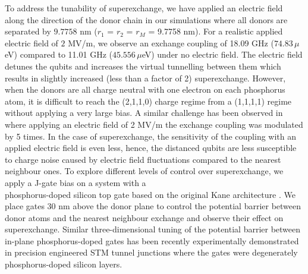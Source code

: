 \documentclass[%
showkeys,
 amsmath,amssymb,
 aps,
prb,
]{revtex4-2}
\begin{document}
To address the tunability of superexchange, we have applied an electric field along the direction of the donor chain in our simulations where all donors are separated by $9.7758$ nm ($r_1$ = $r_2$ = $r_M$ = 9.7758 nm). For a realistic applied electric field of $2$ MV/m, we observe an exchange coupling of 18.09 GHz ($74.83\,\mu$eV) compared to 11.01 GHz ($45.556\,\mu$eV) under no electric field. The electric field detunes the qubits and increases the virtual tunnelling between them which results in slightly increased (less than a factor of 2) superexchange. However, when the donors are all charge neutral with one electron on each phosphorus atom, it is difficult to reach the (2,1,1,0) charge regime from a (1,1,1,1) regime without applying a very large bias. A similar challenge has been observed in \cite{wangHighlyTunableExchange2016a} where applying an electric field of 2 MV/m the exchange coupling was modulated by 5 times. In the case of superexchange, the sensitivity of the coupling with an applied electric field is even less, hence, the distanced qubits are less susceptible to charge noise caused by electric field fluctuations compared to the nearest neighbour ones. 
To explore different levels of control over superexchange, we apply a J-gate bias on a system with a \\ phosphorus-doped silicon top gate based on the original Kane architecture \cite{kaneSiliconbasedNuclearSpin1998}. We place gates 30 nm above the donor plane to control the potential barrier between donor atoms and the nearest neighbour exchange and observe their effect on superexchange. Similar three-dimensional tuning of the potential barrier between in-plane phosphorus-doped gates has been recently experimentally demonstrated \cite{donnelly2021monolithic} in precision engineered STM tunnel junctions where the gates were degenerately phosphorus-doped silicon layers. 
\end{document}
